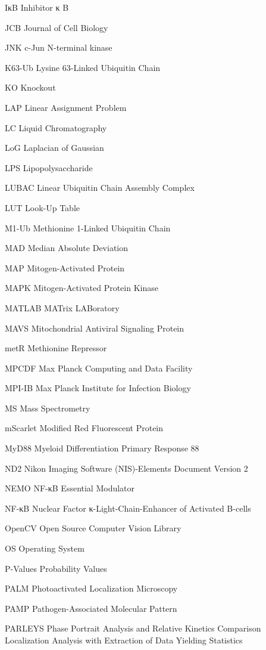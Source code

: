 \begin{spacing}{0.75}
\begin{abbreviations}
\item[IκB] Inhibitor κ B
\item[JCB] Journal of Cell Biology
\item[JNK] c-Jun N-terminal kinase
\item[K63-Ub] Lysine 63-Linked Ubiquitin Chain
\item[KO] Knockout
\item[LAP] Linear Assignment Problem
\item[LC] Liquid Chromatography
\item[LoG] Laplacian of Gaussian
\item[LPS] Lipopolysaccharide
\item[LUBAC] Linear Ubiquitin Chain Assembly Complex
\item[LUT] Look-Up Table
\item[M1-Ub] Methionine 1-Linked Ubiquitin Chain
\item[MAD] Median Absolute Deviation
\item[MAP] Mitogen-Activated Protein
\item[MAPK] Mitogen-Activated Protein Kinase
\item[MATLAB] MATrix LABoratory
\item[MAVS] Mitochondrial Antiviral Signaling Protein
\item[metR] Methionine Repressor
\item[MPCDF] Max Planck Computing and Data Facility
\item[MPI-IB] Max Planck Institute for Infection Biology
\item[MS] Mass Spectrometry
\item[mScarlet] Modified Red Fluorescent Protein
\item[MyD88] Myeloid Differentiation Primary Response 88
\item[ND2] Nikon Imaging Software (NIS)-Elements Document Version 2
\item[NEMO] NF-κB Essential Modulator
\item[NF-κB] Nuclear Factor κ-Light-Chain-Enhancer of Activated B-cells
\item[OpenCV] Open Source Computer Vision Library
\item[OS] Operating System
\item[P-Values] Probability Values
\item[PALM] Photoactivated Localization Microscopy
\item[PAMP] Pathogen-Associated Molecular Pattern
\item[PARLEYS] Phase Portrait Analysis and Relative Kinetics Comparison Localization Analysis with Extraction of Data Yielding Statistics

\end{abbreviations}
\end{spacing}
